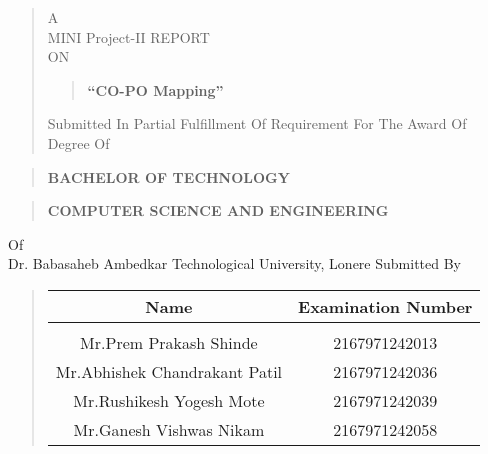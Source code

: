 \documentclass[12pt]{report}
\author{}
\date{}
\begin{document}
	\large
	\centering
	\begin{quote}
		\large
		\centering
		A\\MINI Project-II REPORT\\ON
		
		\begin{quote}
			\centering
			
			\textbf{``CO-PO Mapping''}
		\end{quote}
		
		Submitted In Partial Fulfillment Of Requirement For The Award Of
		Degree Of
	\end{quote}
	
	\begin{quote}
		\centering
		\large
		\textbf{BACHELOR OF TECHNOLOGY}
	\end{quote}
	
	\begin{quote}
		\large
		\centering
		\textbf{COMPUTER SCIENCE AND ENGINEERING}\\
	\end{quote}
	Of\\
	Dr. Babasaheb Ambedkar Technological University, Lonere
	Submitted By
	\vspace{0.5cm}
	\begin{quote}
		\normalsize
		\centering
		\begin{table}[ht]
			\centering
			\begin{tabular}{ c  c }
				\bfseries
				Name & \bfseries Examination Number \\[2ex]
				\hline \\[1ex]
				
				\hspace{-2ex}Mr.Prem Prakash Shinde & 2167971242013\\[1ex]
				\hspace{5ex}Mr.Abhishek Chandrakant Patil & 2167971242036\\[1ex]
				Mr.Rushikesh Yogesh Mote & 2167971242039\\[1ex]
				Mr.Ganesh Vishwas Nikam & 2167971242058\\[1ex]
				
			\end{tabular}
		\end{table}
	\end{quote}
	
\end{document}
